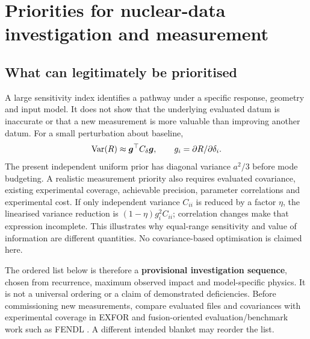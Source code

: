 \section{Priorities for nuclear-data investigation and measurement}
\label{sec:priorities}
\subsection{What can legitimately be prioritised}
A large sensitivity index identifies a pathway under a specific response, geometry and input model. It does not show that the underlying evaluated datum is inaccurate or that a new measurement is more valuable than improving another datum. For a small perturbation about baseline,
\begin{equation}
\operatorname{Var}(R)\approx\bm g^\top C_\delta\bm g,\qquad g_i=\partial R/\partial\delta_i.
\label{eq:covariancepriority}
\end{equation}
The present independent uniform prior has diagonal variance $a^2/3$ before mode budgeting. A realistic measurement priority also requires evaluated covariance, existing experimental coverage, achievable precision, parameter correlations and experimental cost. If only independent variance $C_{ii}$ is reduced by a factor $\eta$, the linearised variance reduction is $(1-\eta)g_i^2C_{ii}$; correlation changes make that expression incomplete. This illustrates why equal-range sensitivity and value of information are different quantities. No covariance-based optimisation is claimed here.

The ordered list below is therefore a \textbf{provisional investigation sequence}, chosen from recurrence, maximum observed impact and model-specific physics. It is not a universal ordering or a claim of demonstrated deficiencies. Before commissioning new measurements, compare evaluated files and covariances with experimental coverage in EXFOR \citep{exfor} and fusion-oriented evaluation/benchmark work such as FENDL \citep{fendl}. A different intended blanket may reorder the list.

